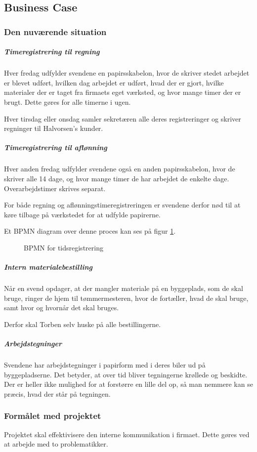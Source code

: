 \subsection{Business Case}
\subsubsection{Den nuværende situation}
\subparagraph{Timeregistrering til regning}

    Hver fredag udfylder svendene en papirsskabelon, hvor de skriver stedet arbejdet er blevet udført, hvilken dag arbejdet er udført, hvad der er gjort, hvilke materialer der er taget fra firmaets eget værksted, og hvor mange timer der er brugt.
    Dette gøres for alle timerne i ugen.
    
    Hver tirsdag eller onsdag samler sekretæren alle deres registreringer og skriver regninger til Halvorsen's kunder.

\subparagraph{Timeregistrering til aflønning}
    Hver anden fredag udfylder svendene også en anden papirsskabelon, hvor de skriver alle 14 dage, og hvor mange timer de har arbejdet de enkelte dage. Overarbejdstimer skrives separat.
    
    For både regning og aflønningstimeregistreringen er svendene derfor nød til at køre tilbage på værkstedet for at udfylde papirerne.

Et BPMN diagram over denne proces kan ses på figur \ref{fig:BPMN}.
    
\begin{figure}
    \caption{BPMN for tidsregistrering}
    \label{fig:BPMN}
\end{figure}
    
\subparagraph{Intern materialebestilling}
    Når en svend opdager, at der mangler materiale på en byggeplads, som de skal bruge, ringer de hjem til tømmermesteren, hvor de fortæller, hvad de skal bruge, samt hvor og hvornår det skal bruges.
    
    Derfor skal Torben selv huske på alle bestillingerne.
    
\subparagraph{Arbejdstegninger}
    Svendene har arbejdstegninger i papirform med i deres biler ud på byggepladserne.
    Det betyder, at over tid bliver tegningerne krøllede og beskidte.
    Der er heller ikke mulighed for at forstørre en lille del op, så man nemmere kan se præcis, hvad der står på tegningen.
    
\subsubsection{Formålet med projektet}
    Projektet skal effektivisere den interne kommunikation i     firmaet.
    Dette gøres ved at arbejde med to problematikker.
    
